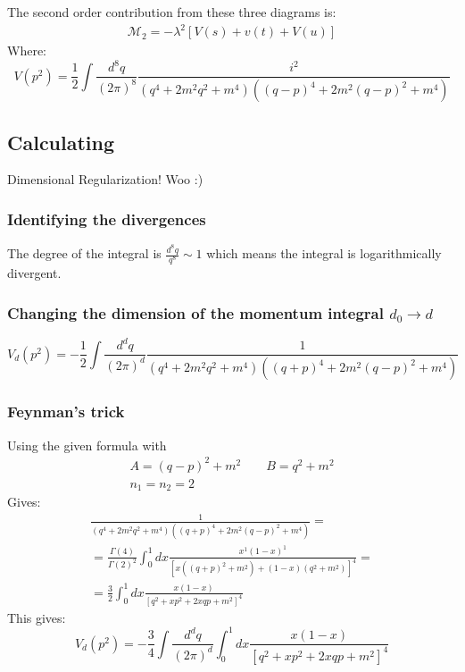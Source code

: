 \documentclass{article}
\begin{document}
The second order contribution from these three diagrams is:
\begin{equation}
\begin{gathered}
    \mathcal{M}_2 = -\lambda^2[V(s) + v(t) + V(u)]
\end{gathered}
\end{equation}
Where:
\begin{equation}
    V(p^2) = \frac{1}{2}\int \frac{d^8q}{(2\pi)^8} \frac{i^2}{(q^4 + 2m^2q^2 + m^4)((q - p)^4 + 2m^2(q - p)^2 + m^4)}
\end{equation}
\subsection{Calculating}
Dimensional Regularization! Woo :)
\newline
\subsubsection*{Identifying the divergences}
The degree of the integral is $\frac{d^8q}{q^8} \sim 1$ which means the integral is logarithmically divergent.
\subsubsection*{Changing the dimension of the momentum integral $d_0 \rightarrow d$}
\begin{equation}
    V_d(p^2) = -\frac{1}{2}\int \frac{d^dq}{(2\pi)^d} \frac{1}{(q^4 + 2m^2q^2 + m^4)((q + p)^4 + 2m^2(q - p)^2 + m^4)}
\end{equation}
\subsubsection*{Feynman's trick}
Using the given formula with
\begin{equation}
\begin{gathered}
    A = (q - p)^2 + m^2
    \qquad
    B = q^2 + m^2
    \\
    n_1 = n_2 = 2
\end{gathered}
\end{equation}
Gives:
\begin{equation}
\begin{gathered}
    \frac{1}{(q^4 + 2m^2q^2 + m^4)((q + p)^4 + 2m^2(q - p)^2 + m^4)} = \\ =
    \frac{\Gamma(4)}{\Gamma(2)^2} \int_0^1 dx \frac{x^1(1 - x)^1}{\left[x((q + p)^2 + m^2) + (1 - x)(q^2 + m^2)\right]^4} = \\ =
    \frac{3}{2} \int_0^1 dx \frac{x(1 - x)}{\left[q^2 + xp^2 + 2xqp + m^2\right]^4}
\end{gathered}
\end{equation}
This gives:
\begin{equation}
    V_d(p^2) = -\frac{3}{4}\int \frac{d^dq}{(2\pi)^d}\int_0^1 dx \frac{x(1 - x)}{\left[q^2 + xp^2 + 2xqp + m^2\right]^4}
\end{equation}
\end{document}

